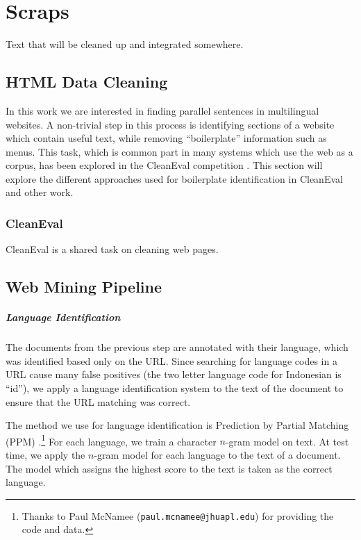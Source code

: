 \chapter{Scraps}
Text that will be cleaned up and integrated somewhere.

\section{HTML Data Cleaning}
In this work we are interested in finding parallel sentences in multilingual
websites. A non-trivial step in this process is identifying sections of a website
which contain useful text, while removing ``boilerplate'' information such as
menus. This task, which is common part in many systems which use the web as a
corpus, has been explored in the CleanEval competition \citep{CleanEval}. This
section will explore the different approaches used for boilerplate
identification in CleanEval and other work.

\subsection{CleanEval}
CleanEval \citep{CleanEval} is a shared task on cleaning web pages. 

\section{Web Mining Pipeline}

\paragraph{Language Identification}
The documents from the previous step are annotated with their language, which
was identified based only on the URL. Since searching for language codes in a
URL cause many false positives (the two letter language code for Indonesian is
``id''), we apply a language identification system to the text of the document
to ensure that the URL matching was correct. 

The method we use for language identification is Prediction by Partial Matching
(PPM) \citep{Cleary84}.\footnote{Thanks to Paul McNamee
({\tt paul.mcnamee@jhuapl.edu}) for providing the code and data.} For each
language, we train a character $n$-gram model on text. At test time, we apply
the $n$-gram model for each language to the text of a document. The model which
assigns the highest score to the text is taken as the correct language.

